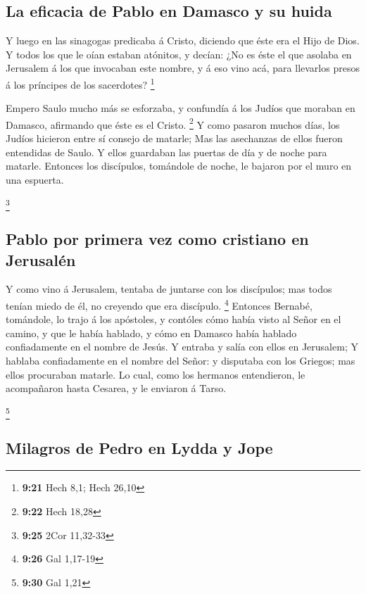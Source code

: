 \hypertarget{la-eficacia-de-pablo-en-damasco-y-su-huida}{%
\subsection{La eficacia de Pablo en Damasco y su
huida}\label{la-eficacia-de-pablo-en-damasco-y-su-huida}}

 Y luego en las sinagogas predicaba á Cristo, diciendo que
éste era el Hijo de Dios.  Y todos los que le oían estaban
atónitos, y decían: ¿No es éste el que asolaba en Jerusalem á los que
invocaban este nombre, y á eso vino acá, para llevarlos presos á los
príncipes de los sacerdotes? \footnote{\textbf{9:21} Hech 8,1; Hech
  26,10}

 Empero Saulo mucho más se esforzaba, y confundía á los
Judíos que moraban en Damasco, afirmando que éste es el Cristo.
\footnote{\textbf{9:22} Hech 18,28}  Y como pasaron muchos
días, los Judíos hicieron entre sí consejo de matarle;  Mas
las asechanzas de ellos fueron entendidas de Saulo. Y ellos guardaban
las puertas de día y de noche para matarle.  Entonces los
discípulos, tomándole de noche, le bajaron por el muro en una espuerta.

\footnote{\textbf{9:25} 2Cor 11,32-33}

\hypertarget{pablo-por-primera-vez-como-cristiano-en-jerusaluxe9n}{%
\subsection{Pablo por primera vez como cristiano en
Jerusalén}\label{pablo-por-primera-vez-como-cristiano-en-jerusaluxe9n}}

 Y como vino á Jerusalem, tentaba de juntarse con los
discípulos; mas todos tenían miedo de él, no creyendo que era discípulo.
\footnote{\textbf{9:26} Gal 1,17-19}  Entonces Bernabé,
tomándole, lo trajo á los apóstoles, y contóles cómo había visto al
Señor en el camino, y que le había hablado, y cómo en Damasco había
hablado confiadamente en el nombre de Jesús.  Y entraba y
salía con ellos en Jerusalem;  Y hablaba confiadamente en
el nombre del Señor: y disputaba con los Griegos; mas ellos procuraban
matarle.  Lo cual, como los hermanos entendieron, le
acompañaron hasta Cesarea, y le enviaron á Tarso.

\footnote{\textbf{9:30} Gal 1,21}

\hypertarget{milagros-de-pedro-en-lydda-y-jope}{%
\subsection{Milagros de Pedro en Lydda y
Jope}\label{milagros-de-pedro-en-lydda-y-jope}}

